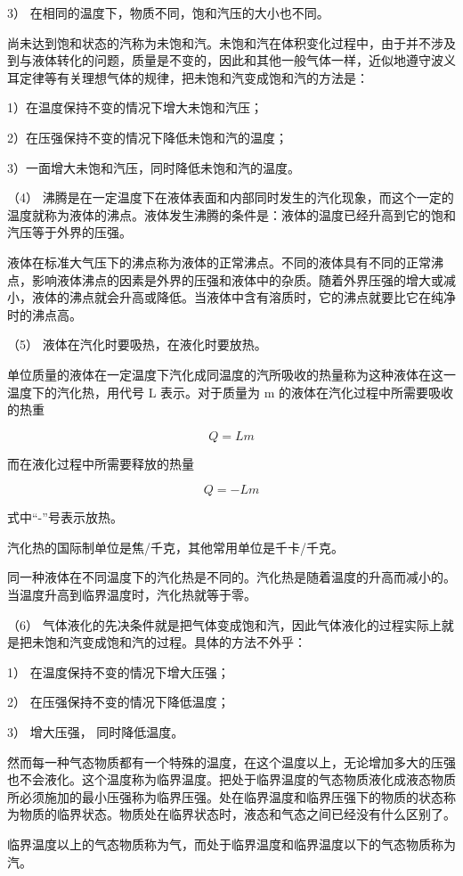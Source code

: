 3） 在相同的温度下，物质不同，饱和汽压的大小也不同。

尚未达到饱和状态的汽称为未饱和汽。未饱和汽在体积变化过程中，由于并不涉及到与液体转化的问题，质量是不变的，因此和其他一般气体一样，近似地遵守波义耳定律等有关理想气体的规律，把未饱和汽变成饱和汽的方法是：

1）在温度保持不变的情况下增大未饱和汽压；

2）在压强保持不变的情况下降低未饱和汽的温度；

3）一面增大未饱和汽压，同时降低未饱和汽的温度。

（4）
沸腾是在一定温度下在液体表面和内部同时发生的汽化现象，而这个一定的温度就称为液体的沸点。液体发生沸腾的条件是：液体的温度已经升高到它的饱和汽压等于外界的压强。

液体在标准大气压下的沸点称为液体的正常沸点。不同的液体具有不同的正常沸点，影响液体沸点的因素是外界的压强和液体中的杂质。随着外界压强的增大或减小，液体的沸点就会升高或降低。当液体中含有溶质时，它的沸点就要比它在纯净时的沸点高。

（5） 液体在汽化时要吸热，在液化时要放热。

单位质量的液体在一定温度下汽化成同温度的汽所吸收的热量称为这种液体在这一温度下的汽化热，用代号
L 表示。对于质量为 m 的液体在汽化过程中所需要吸收的热重

\[
Q = L m
\]

而在液化过程中所需要释放的热量

\[
Q=-Lm
\]

式中``-''号表示放热。

汽化热的国际制单位是焦/千克，其他常用单位是千卡/千克。

同一种液体在不同温度下的汽化热是不同的。汽化热是随着温度的升高而减小的。当温度升高到临界温度时，汽化热就等于零。

（6）
气体液化的先决条件就是把气体变成饱和汽，因此气体液化的过程实际上就是把未饱和汽变成饱和汽的过程。具体的方法不外乎：

1） 在温度保持不变的情况下增大压强；

2） 在压强保持不变的情况下降低温度；

3） 增大压强， 同时降低温度。

然而每一种气态物质都有一个特殊的温度，在这个温度以上，无论增加多大的压强也不会液化。这个温度称为临界温度。把处于临界温度的气态物质液化成液态物质所必须施加的最小压强称为临界压强。处在临界温度和临界压强下的物质的状态称为物质的临界状态。物质处在临界状态时，液态和气态之间已经没有什么区别了。

临界温度以上的气态物质称为气，而处于临界温度和临界温度以下的气态物质称为汽。

